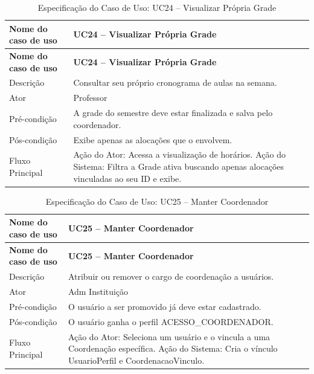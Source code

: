 \fonteautores

\vspace{\baselineskip}

\Needspace{0.48\textheight}
\begin{longtable}{|L{4.5cm}|L{10.5cm}|}
\caption{Especificação do Caso de Uso: UC24 -- Visualizar Própria Grade} \\
\hline
\textbf{Nome do caso de uso} & \textbf{UC24 -- Visualizar Própria Grade} \\
\hline
\endfirsthead
\hline
\textbf{Nome do caso de uso} & \textbf{UC24 -- Visualizar Própria Grade} \\
\hline
\endhead
Descrição       & Consultar seu próprio cronograma de aulas na semana. \\
\hline
Ator            & Professor \\
\hline
Pré-condição    & A grade do semestre deve estar finalizada e salva pelo coordenador. \\
\hline
Pós-condição    & Exibe apenas as alocações que o envolvem. \\
\hline
Fluxo Principal & Ação do Ator: Acessa a visualização de horários. Ação do Sistema: Filtra a Grade ativa buscando apenas alocações vinculadas ao seu ID e exibe. \\
\hline
\end{longtable}

\fonteautores

\vspace{\baselineskip}

\Needspace{0.48\textheight}
\begin{longtable}{|L{4.5cm}|L{10.5cm}|}
\caption{Especificação do Caso de Uso: UC25 -- Manter Coordenador} \\
\hline
\textbf{Nome do caso de uso} & \textbf{UC25 -- Manter Coordenador} \\
\hline
\endfirsthead
\hline
\textbf{Nome do caso de uso} & \textbf{UC25 -- Manter Coordenador} \\
\hline
\endhead
Descrição       & Atribuir ou remover o cargo de coordenação a usuários. \\
\hline
Ator            & Adm Instituição \\
\hline
Pré-condição    & O usuário a ser promovido já deve estar cadastrado. \\
\hline
Pós-condição    & O usuário ganha o perfil ACESSO\_COORDENADOR. \\
\hline
Fluxo Principal & Ação do Ator: Seleciona um usuário e o vincula a uma Coordenação específica. Ação do Sistema: Cria o vínculo UsuarioPerfil e CoordenacaoVinculo. \\
\hline
\end{longtable}

